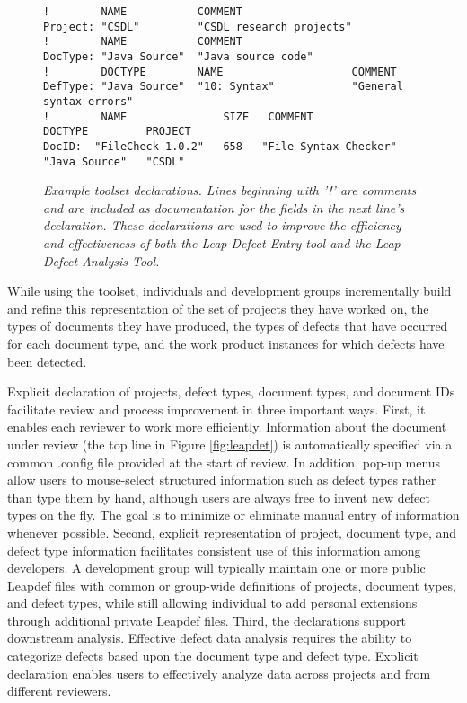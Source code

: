 \begin{figure*}[t]
\small
\begin{verbatim}
!        NAME           COMMENT
Project: "CSDL"         "CSDL research projects"
!        NAME           COMMENT
DocType: "Java Source"  "Java source code"
!        DOCTYPE        NAME                    COMMENT         
DefType: "Java Source"  "10: Syntax"            "General syntax errors"
!        NAME               SIZE   COMMENT              DOCTYPE         PROJECT
DocID:  "FileCheck 1.0.2"   658   "File Syntax Checker" "Java Source"   "CSDL"
\end{verbatim}
\normalsize
 \caption{{\em Example toolset declarations. Lines beginning with '!' are
 comments and are included as documentation for the fields in the next
 line's declaration. These declarations are used to improve the efficiency
and effectiveness of both the Leap Defect Entry tool and the Leap Defect Analysis Tool. }}
 \label{fig:leapdef}
\end{figure*}

While using the toolset, individuals and development groups
incrementally build and refine this representation of the set of projects
they have worked on, the types of documents they have produced, the types
of defects that have occurred for each document type, and the work product
instances for which defects have been detected.

Explicit declaration of projects, defect types, document types, and
document IDs facilitate review and process improvement in three important
ways.  First, it enables each reviewer to work more efficiently.
Information about the document under review (the top line in Figure
\ref{fig:leapdet}) is automatically specified via a common .config file
provided at the start of review. In addition, pop-up menus allow users to
mouse-select structured information such as defect types rather than type
them by hand, although users are always free to invent new defect types on
the fly.  The goal is to minimize or eliminate manual entry of information
whenever possible.  Second, explicit representation of
project, document type, and defect type information facilitates
consistent use of this information among developers. A
development group will typically maintain one or more public Leapdef files with common
or group-wide definitions of projects, document types, and defect types,
while still allowing individual to add personal extensions through
additional private Leapdef files. Third, the declarations support downstream
analysis. Effective defect data analysis requires the ability to categorize
defects based upon the document type and defect type.  Explicit declaration
enables users to effectively analyze data across projects and from
different reviewers.

